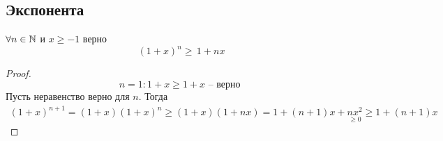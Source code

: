 \subsection{Экспонента}
\begin{theorem}
\label{BernoulliInequality}
    $ \forall n \in \mathbb{N} $ и $ x \geq  -1 $ верно \begin{equation*}
        (1 + x)^ n \geq\, 1 + nx
    \end{equation*}
\end{theorem}
\begin{proof}
    \begin{equation*}
    n = 1: 1 + x \geq 1 + x \text{ -- верно }
   \end{equation*}
   Пусть неравенство верно для $ n $. Тогда \begin{multline*}
    (1 + x)^{n + 1} = (1 + x)(1 + x)^ n \geq (1 + x)(1 + nx) = 1 + (n + 1)x + \underset{ \geq 0}{nx^2} \geq 1 + (n + 1)x
   \end{multline*}
\end{proof}


